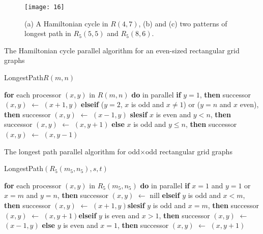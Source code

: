 \documentclass[preprint,12pt]{elsarticle}
\begin{document}
\begin{figure}[htp]
  \centering
  \texttt{[image: 16]}
  \caption[]{(a) A Hamiltonian cycle in $R(4, 7)$, (b) and (c) two patterns of longest path in $R_5(5,5)$ and $R_5(8,6)$.}
  \label{e}
\end{figure}
\begin{algorithm}
\caption{The Hamiltonian cycle parallel algorithm for an even-sized
rectangular grid graphs} \label{alg:2}
\begin{algorithmic}
\PROC LongestPath$R(m,n)$
\end{algorithmic}
\begin{algorithmic}[1]
{\small \STATE \textbf{for} each processor $(x,y)$ in $R(m,n)$
\textbf{do} in parallel \STATE \textbf{if} $y=1$, \textbf{then}
successor $(x,y)$ $\leftarrow$ $(x+1,y)$ \STATE \textbf{elseif}
($y=2$, $x$ is odd and $x\neq 1$) or ($y=n$ and $x$ even),
\textbf{then} successor $(x,y)$ $\longleftarrow$ $(x-1,y)$\STATE
\textbf{slesif} $x$ is even and $y<n$, \textbf{then} successor
$(x,y)$ $\longleftarrow$ $(x,y+1)$
 \STATE \textbf{else} $x$ is odd and $y\leq n$, \textbf{then} successor $(x,y)$ $\longleftarrow$ $(x,y-1)$}
\end{algorithmic}
\end{algorithm}
\begin{algorithm}
\caption{The longest path parallel algorithm for odd$\times$odd
rectangular grid graphs} \label{alg:3}
\begin{algorithmic}
\PROC LongestPath$(R_5(m_5,n_5),s,t)$
\end{algorithmic}
\begin{algorithmic}[1]
{\small \STATE \textbf{for} each processor $(x,y)$ in $R_5(m_5,n_5)$
\textbf{do} in parallel \STATE \textbf{if} $x=1$ and $y=1$ or $x=m$
and $y=n$, \textbf{then} successor $(x,y)$ $\longleftarrow$ nill
\STATE \textbf{elseif} $y$ is odd and $x<m$, \textbf{then} successor
$(x,y)$ $\longleftarrow$ $(x+1,y)$\STATE \textbf{slesif} $y$ is odd
and $x=m$, \textbf{then} successor $(x,y)$ $\longleftarrow$
$(x,y+1)$\STATE \textbf{elseif} $y$ is even and $x>1$, \textbf{then}
successor $(x,y)$ $\longleftarrow$ $(x-1,y)$
 \STATE \textbf{else} $y$ is even and $x=1$, \textbf{then} successor $(x,y)$ $\longleftarrow$ $(x,y+1)$}
\end{algorithmic}
\end{algorithm}
\end{document}
